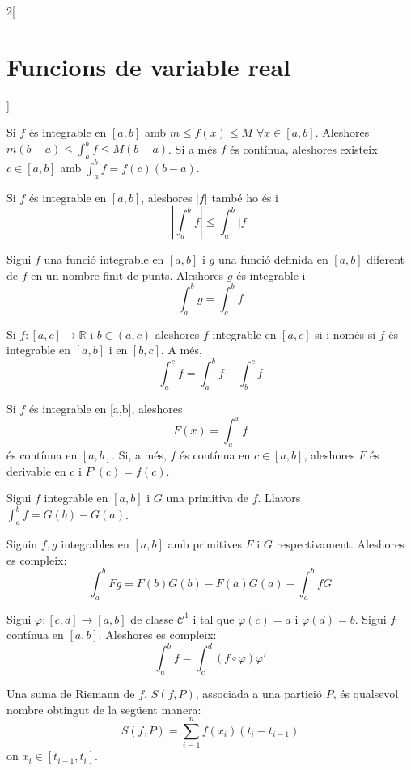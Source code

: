 \documentclass[../../../main.tex]{subfiles}
\begin{document}
\begin{multicols}{2}[\section{Funcions de variable real}]
\begin{prop}
\end{prop}
\begin{corollary}
Si $f$ és integrable en $[a,b]$ amb $m\leq f(x)\leq M$ $\forall x\in [a,b]$. Aleshores $m(b-a)\leq\int_a^bf\leq M(b-a)$. Si a més $f$ és contínua, aleshores existeix $c\in[a,b]$ amb $\int_a^bf=f(c)(b-a)$.
\end{corollary}
\begin{prop}
Si $f$ és integrable en $[a,b]$, aleshores $|f|$ també ho és i $$\left|\int_a^bf\right|\leq\int_a^b|f|$$
\end{prop}
\begin{prop}
Sigui $f$ una funció integrable en $[a,b]$ i $g$ una funció definida en $[a,b]$ diferent de $f$ en un nombre finit de punts. Aleshores $g$ és integrable i $$\int_a^bg=\int_a^bf$$
\end{prop}
\begin{prop}
Si $f:[a,c]\rightarrow\mathbb{R}$ i $b\in(a,c)$ aleshores $f$ integrable en $[a,c]$ si i només si $f$ és integrable en $[a,b]$ i en $[b,c]$. A més, $$\int_a^cf=\int_a^bf+\int_b^cf$$
\end{prop}
\begin{theorem}
Si $f$ és integrable en [a,b], aleshores $$F(x)=\int_a^xf$$ és contínua en $[a,b]$. Si, a més, $f$ és contínua en $c\in[a,b]$, aleshores $F$ és derivable en $c$ i $F'(c)=f(c)$.
\end{theorem}
\begin{theorem}
Sigui $f$ integrable en $[a,b]$ i $G$ una primitiva de $f$. Llavors $\int_a^bf=G(b)-G(a)$.
\end{theorem}
\begin{corollary}
Siguin $f,g$ integrables en $[a,b]$ amb primitives $F$ i $G$ respectivament. Aleshores es compleix: $$\int_a^bFg=F(b)G(b)-F(a)G(a)-\int_a^bfG$$
\end{corollary}
\begin{corollary}
Sigui $\varphi:[c,d]\rightarrow[a,b]$ de classe $\mathcal{C}^1$ i tal que $\varphi(c)=a$ i $\varphi(d)=b$. Sigui $f$ contínua en $[a,b]$. Aleshores es compleix: $$\int_a^bf=\int_c^d(f\circ\varphi)\varphi'$$
\end{corollary}
\begin{definition}
Una suma de Riemann de $f$, $S(f,P)$, associada a una partició $P$, és qualsevol nombre obtingut de la següent manera: $$S(f,P)=\sum_{i=1}^nf(x_i)(t_i-t_{i-1})$$ on $x_i\in[t_{i-1},t_i]$.
\end{definition}

\end{multicols}
\end{document}
